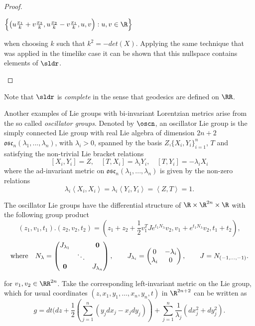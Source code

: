 \documentclass[11pt]{amsart}
\newcommand{\lela}{\left \langle}
\newcommand{\rira}{\right \rangle}
\theoremstyle{plain}
\theoremstyle{definition}
\theoremstyle{remark}
\begin{document}
\begin{proof}
\begin{itemize}
 $\Bigl\{ \big( u \frac{x_1}{k}+v\frac{x_3}{k},u\frac{x_2}{k}-v\frac{x_1}{k},u,v \Big):u,v \in \R \Bigr\}$
 
  when choosing $k$ such that $k^2=-det(X)$. Applying the same technique that was applied in the timelike case it can be shown that this nullspace contains elements of $\sldr$.
\end{itemize}
\end{proof}


Note that $\sldr$ is {\em complete} in the sense that geodesics are defined on $\RR$. 

\smallskip

Another examples of Lie groups with bi-invariant Lorentzian metrics arise from the so called  \textit{oscillator groups}. Denoted by $\oscn$, an oscillator Lie group is the simply connected Lie group with real Lie algebra of dimension $2n+2$ $\mathfrak{osc}_n(\lambda_1,...,\lambda_n)$, with $\lambda_i > 0$,  spanned by the basis $Z$,$\{X_i,Y_i\}_{i=1}^n$, $T$ and satisfying  the non-trivial Lie bracket relations
\[ [X_i,Y_i]=Z, \quad [T, X_i]=\lambda_i Y_i, \quad  [T, Y_i]=- \lambda_i X_i  \]
where the ad-invariant  metric on $\mathfrak{osc}_n(\lambda_1,...,\lambda_n)$ is given by the non-zero relations
\[ \lambda_i \lela X_i,X_i \rira  = \lambda_i \lela Y_i,Y_i \rira = \lela Z,T  \rira  = 1.\]
 
The oscillator Lie groups   have the differential structure of $\R \times \R^{2n} \times \R$ with the following group product
\begin{equation*}
(z_1,v_1,t_1) . (z_2,v_2,t_2)=(z_1+z_2+\frac{1}{2}v_1^{T}J e^{t_1 N_{\lambda}}v_2,v_1+e^{t_1 N_{\lambda}}v_2,t_1+t_2),
\end{equation*}
\[\text{where \,\,  } 
%
N_\lambda=\left( \begin{matrix}
J_{\lambda_1} &  & \mathbf{0} \\
 & \ddots & \\
\mathbf{0} & & J_{\lambda_n}
\end{matrix} \right), \qquad 
%
J_{\lambda_i}=\left( \begin{matrix}
0 & -\lambda_i \\
\lambda_i & 0
\end{matrix} \right), \qquad J = N_{(-1, \hdots, -1)}.
\]

for $v_1, v_2\in \RR^{2n}$.
Take the corresponding left-invariant metric on the Lie group, which for usual  coordinates $(z, x_1,y_1,\hdots,x_n,y_n, t)$ in $\R^{2n+2}$  can be written as
\begin{equation}\label{metricosc}
g=dt (dz + \frac12 (\sum_{j=1}^{n} (y_jdx_j-x_jdy_j))+\sum_{j=1}^{n}\frac1{\lambda_j}(dx_j^2+dy_j^2).
\end{equation}
\end{document}
